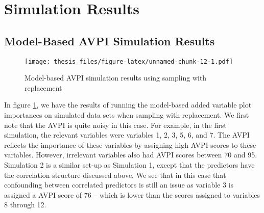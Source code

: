 \documentclass[12pt,twoside]{reedthesis}
\theoremstyle{definition}
\theoremstyle{definition}
\theoremstyle{definition}
\theoremstyle{remark}
\begin{document}
\section{Simulation Results}\label{simulation-results}

\subsection{Model-Based AVPI Simulation
Results}\label{model-based-avpi-simulation-results}
\begin{figure}
\centering
\texttt{[image: thesis\_files/figure-latex/unnamed-chunk-12-1.pdf]}
\caption{\label{fig:unnamed-chunk-12}\label{AVPIwrep}Model-based AVPI
simulation results using sampling with replacement}
\end{figure}
In figure \ref{AVPIwrep}, we have the results of running the model-based
added variable plot importances on simulated data sets when sampling
with replacement. We first note that the AVPI is quite noisy in this
case. For example, in the first simulation, the relevant variables were
variables 1, 2, 3, 5, 6, and 7. The AVPI reflects the importance of
these variables by assigning high AVPI scores to these variables.
However, irrelevant variables also had AVPI scores between 70 and 95.
Simulation 2 is a similar set-up as Simulation 1, except that the
predictors have the correlation structure discussed above. We see that
in this case that confounding between correlated predictors is still an
issue as variable 3 is assigned a AVPI score of 76 -- which is lower
than the scores assigned to variables 8 through 12. \par
\end{document}
